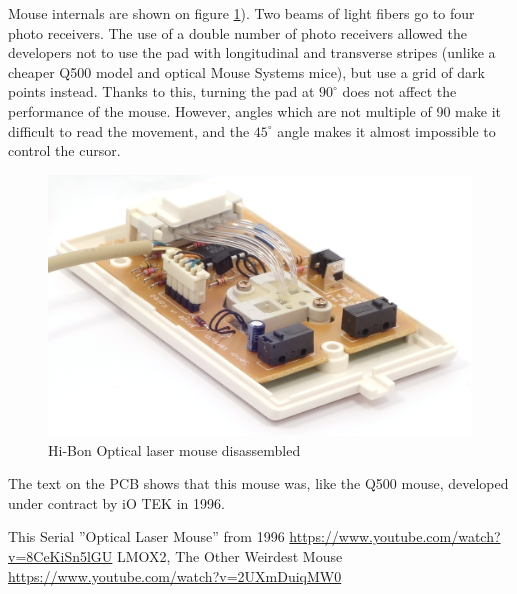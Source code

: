 \documentclass[11pt, a4paper]{article}
\begin{document}
Mouse internals are shown on figure \ref{fig:OpticalLaserMouseInside}). Two beams of light fibers go to four photo receivers. The use of a double number of photo receivers allowed the developers not to use the pad with longitudinal and transverse stripes (unlike a cheaper Q500 model and optical Mouse Systems mice), but use a grid of dark points instead. Thanks to this, turning the pad at $90^\circ$ does not affect the performance of the mouse. However, angles which are not multiple of 90 make it difficult to read the movement, and the $45^\circ$ angle makes it almost impossible to control the cursor\cite{comparison}.

\begin{figure}[h]
    \centering
    \includegraphics[scale=0.8]{1996_hi-bon_laser_mouse/inside_60.jpg}
    \caption{Hi-Bon Optical laser mouse disassembled}
    \label{fig:OpticalLaserMouseInside}
\end{figure}

The text on the PCB shows that this mouse was, like the Q500 mouse, developed under contract by iO TEK in 1996.

\begin{thebibliography}{9}
 This Serial ''Optical Laser Mouse'' from 1996 \url{https://www.youtube.com/watch?v=8CeKiSn5lGU}
 LMOX2, The Other Weirdest Mouse \url{https://www.youtube.com/watch?v=2UXmDuiqMW0}

\end{thebibliography}
\end{document}
